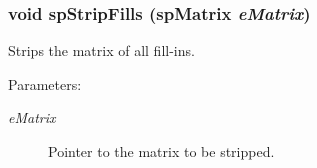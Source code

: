 \subsubsection{\setlength{\rightskip}{0pt plus 5cm}void sp\-Strip\-Fills ({\bf sp\-Matrix} {\em e\-Matrix})}\label{spUtils_8c_a17}


Strips the matrix of all fill-ins.\begin{Desc}
\item[Parameters: ]\par
\begin{description}
\item[{\em 
e\-Matrix}]Pointer to the matrix to be stripped. \end{description}
\end{Desc}
